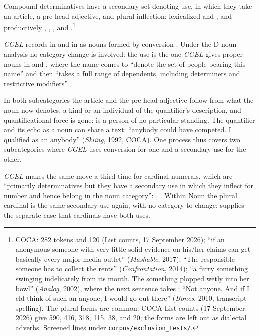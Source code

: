 \documentclass[12pt]{article}
\begin{document}
Compound determinatives have a secondary set-denoting use, in which they take an article, a pre-head adjective, and plural inflection: lexicalized  and , and productively , , , and .\footnote{COCA:  282 tokens and  120 (List counts, 17 September 2026); \enquote{if an anonymous someone with very little solid evidence on his/her claims can get basically every major media outlet} (\textit{Mashable}, 2017); \enquote{The responsible someone has to collect the rents} (\textit{Confrontation}, 2014); \enquote{a furry something swinging indelicately from its mouth. The something plopped wetly into her bowl} (\textit{Analog}, 2002), where the next sentence takes ; \enquote{Not anyone. And if I cld think of such an anyone, I would go out there} (\textit{Bones}, 2010, transcript spelling). The plural forms are common: COCA List counts (17 September 2026) give  590,  416,  318,  115,  38, and  20; the  forms are left out as dialectal adverbs. Screened lines under \texttt{corpus/exclusion\_tests/}.}

\textit{CGEL} records  in  and  in  as nouns formed by conversion \citep[423, n.~43]{huddleston2002}. Under the D-noun analysis no category change is involved: the use is the one \textit{CGEL} gives proper nouns in  and , where the name comes to \enquote{denote the set of people bearing this name} and then \enquote{takes a full range of dependents, including determiners and restrictive modifiers} \citep[521]{huddleston2002}.

In both subcategories the article and the pre-head adjective follow from what the noun now denotes, a kind or an individual of the quantifier's description, and quantificational force is gone:  is a person of no particular standing. The quantifier and its echo as a noun can share a text: \enquote{anybody could have competed. I qualified as an anybody} (\textit{Skiing}, 1992, COCA). One process thus covers two subcategories where \textit{CGEL} uses conversion for one and a secondary use for the other.

\textit{CGEL} makes the same move a third time for cardinal numerals, which are \enquote{primarily determinatives but they have a secondary use in which they inflect for number and hence belong in the noun category}: ,  \citep[385]{huddleston2002}. Within Noun the plural cardinal is the same secondary use again, with no category to change; \textcite{reynolds2026numerals} supplies the separate case that cardinals have both uses.
\end{document}
